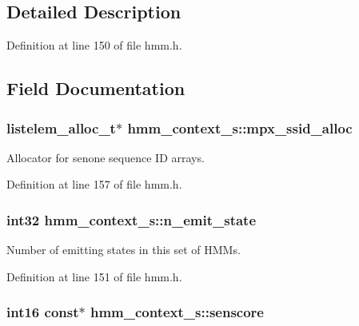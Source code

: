 \subsection{Detailed Description}


Definition at line 150 of file hmm.\-h.



\subsection{Field Documentation}
\subsubsection[{mpx\-\_\-ssid\-\_\-alloc}]{\setlength{\rightskip}{0pt plus 5cm}listelem\-\_\-alloc\-\_\-t$\ast$ hmm\-\_\-context\-\_\-s\-::mpx\-\_\-ssid\-\_\-alloc}\label{structhmm__context__s_a63486d186a984a87d060064e65fab564}


Allocator for senone sequence I\-D arrays. 



Definition at line 157 of file hmm.\-h.

\subsubsection[{n\-\_\-emit\-\_\-state}]{\setlength{\rightskip}{0pt plus 5cm}int32 hmm\-\_\-context\-\_\-s\-::n\-\_\-emit\-\_\-state}\label{structhmm__context__s_a27ba4c5db11110bddf240dd52ed36084}


Number of emitting states in this set of H\-M\-Ms. 



Definition at line 151 of file hmm.\-h.

\subsubsection[{senscore}]{\setlength{\rightskip}{0pt plus 5cm}int16 const$\ast$ hmm\-\_\-context\-\_\-s\-::senscore}\label{structhmm__context__s_a1cca9eb94bc20d9c5e60f2da18074397}


